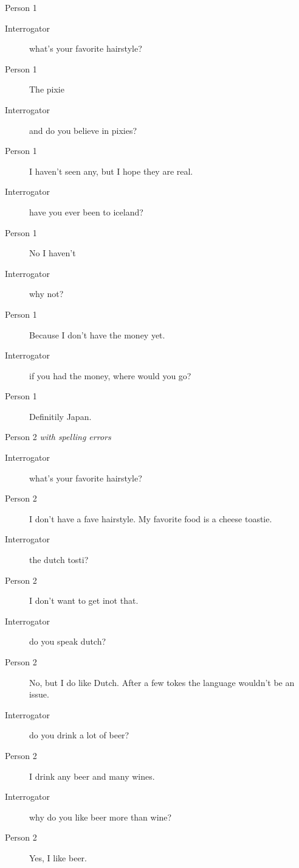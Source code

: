 \begin{itemize}
\begin{description}
\begin{description}
            \end{description}
         \item [Second conversation] Person 1
            \begin{description}
               \item [Interrogator] what's your favorite hairstyle?
               \item [Person 1] The pixie
               \item [Interrogator] and do you believe in pixies?
               \item [Person 1] I haven't seen any, but I hope they are real.
               \item [Interrogator] have you ever been to iceland?
               \item [Person 1] No I haven't
               \item [Interrogator] why not?
               \item [Person 1] Because I don't have the money yet.
               \item [Interrogator] if you had the money, where would you go?
               \item [Person 1] Definitily Japan.
            \end{description}
         \item [Second conversation] Person 2 \textit{with spelling errors}
            \begin{description}
               \item [Interrogator] what's your favorite hairstyle?
               \item [Person 2] I don't have a fave hairstyle. My favorite food is a cheese toastie.
               \item [Interrogator] the dutch tosti?
               \item [Person 2] I don't want to get inot that.
               \item [Interrogator] do you speak dutch?
               \item [Person 2] No, but I do like Dutch. After a few tokes the language wouldn't be an issue.
               \item [Interrogator] do you drink a lot of beer?
               \item [Person 2] I drink any beer and many wines.
               \item [Interrogator] why do you like beer more than wine?
               \item [Person 2] Yes, I like beer.
            \end{description}
      \end{description}


\end{itemize}
